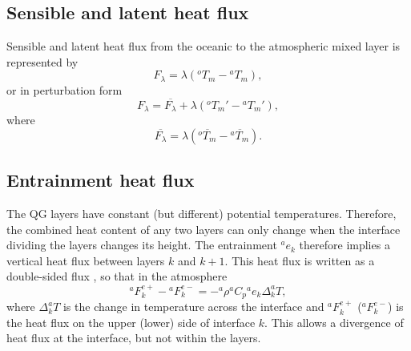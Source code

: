 \documentclass[11pt, a4paper,twoside]{article}
\newcommand{\dt}[2]{\Delta_{#2}^{#1}T}
\newcommand{\rhb}[1]{{{}^{#1}\rho}}
\newcommand{\cp}[1]{{{}^{#1}C_p}}
\newcommand{\e}[2]{{{}^{#1}e_{#2}}}
\newcommand{\T}[2]{{{}^{#1}T_{#2}}}
\newcommand{\F}[3]{{{}^{#1}F^{#3}_{#2}}}
\numberwithin{equation}{section}
\begin{document}
\subsection{Sensible and latent heat flux}
Sensible and latent heat flux from the oceanic to the atmospheric mixed layer is represented by
\begin{equation}
F_{\lambda}=\lambda(\T{o}{m} - \T{a}{m}),
\end{equation}
or in perturbation form
\begin{equation}
F_{\lambda}=\overline{F_{\lambda}} + \lambda(\T{o}{m}' - \T{a}{m}'),
\end{equation}
where
\begin{equation}
\overline{F_{\lambda}}=\lambda(\overline{\T{o}{m}} - \overline{\T{a}{m}}).
\end{equation}

\subsection{Entrainment heat flux}
The QG layers have constant (but different) potential temperatures.
Therefore, the combined heat content of any two layers can only change when the interface dividing the layers changes its height.
The entrainment $\e{a}{k}$ therefore implies a vertical heat flux between layers $k$ and $k+1$.
This heat flux is written as a double-sided flux \citep[see][]{mcdougall:98}, so that in the atmosphere
\begin{equation}\label{eq:fent2}
\F{a}{k}{e+} - \F{a}{k}{e-} = - \rhb{a} \cp{a} \e{a}{k} \dt{a}{k},
\end{equation}
where $\dt{a}{k}$ is the change in temperature across the interface and $\F{a}{k}{e+}$ ($\F{a}{k}{e-}$) is the heat flux on the upper (lower) side of interface $k$.
This allows a divergence of heat flux at the interface, but not within the layers.
\end{document}
